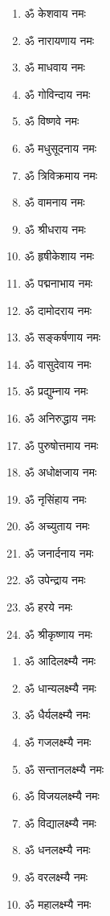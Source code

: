 \begin{center}
\begin{multicols}{2}
\begin{enumerate}
\item ॐ केशवाय नमः
\item ॐ नारायणाय नमः
\item ॐ माधवाय नमः
\item ॐ गोविन्दाय नमः
\item ॐ विष्णवे नमः 
\item ॐ मधुसूदनाय नमः
\item ॐ त्रिविक्रमाय नमः
\item ॐ वामनाय नमः
\item ॐ श्रीधराय नमः
\item ॐ हृषीकेशाय नमः
\item ॐ पद्मनाभाय नमः
\item ॐ दामोदराय नमः
\item ॐ सङ्कर्षणाय नमः
\item ॐ वासुदेवाय नमः
\item ॐ प्रद्युम्नाय नमः
\item ॐ अनिरुद्धाय नमः
\item ॐ पुरुषोत्तमाय नमः
\item ॐ अधोक्षजाय नमः
\item ॐ नृसिंहाय नमः
\item ॐ अच्युताय नमः
\item ॐ जनार्दनाय नमः
\item ॐ उपेन्द्राय नमः 
\item ॐ हरये नमः
\item ॐ श्रीकृष्णाय नमः
\end{enumerate}
\end{multicols}


\begin{multicols}{2}
\begin{enumerate}
\item ॐ आदिलक्ष्म्यै नमः
\item ॐ धान्यलक्ष्म्यै नमः
\item ॐ धैर्यलक्ष्म्यै नमः
\item ॐ गजलक्ष्म्यै नमः
\item ॐ सन्तानलक्ष्म्यै नमः
\item ॐ विजयलक्ष्म्यै नमः
\item ॐ विद्यालक्ष्म्यै नमः
\item ॐ धनलक्ष्म्यै नमः
\item ॐ वरलक्ष्म्यै नमः
\item ॐ महालक्ष्म्यै नमः 
\end{enumerate}
\end{multicols}
\clearpage
{}


\end{center}
